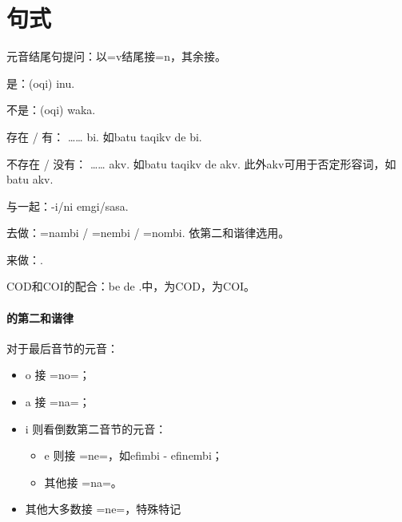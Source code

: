 \section{句式}

元音结尾句提问：以=v结尾接=n，其余接。

是：\A (oqi) \B inu.

不是：\A (oqi) \B waka.

存在 / 有： …… bi. 如batu taqikv de bi.

不存在 / 没有： …… akv. 如batu taqikv de akv. 此外akv可用于否定形容词，如batu    akv.

\A 与\B 一起：\A \B -i/ni emgi/sasa.

去做\V ：\V =nambi / \V =nembi / \V =nombi. 依第二和谐律选用。

来做\V ：\V {}.

COD和COI的配合：\A \B be \C de .中，\B 为COD，\C 为COI。

\paragraph{的第二和谐律} 对于最后音节的元音：
\begin{itemize}
    \item o 接 =no=；
    \item a 接 =na=；
    \item i 则看倒数第二音节的元音：
    \begin{itemize}
        \item e 则接 =ne=，如efimbi - efinembi；
        \item 其他接 =na=。 
    \end{itemize}
    \item 其他大多数接 =ne=，特殊特记
\end{itemize}